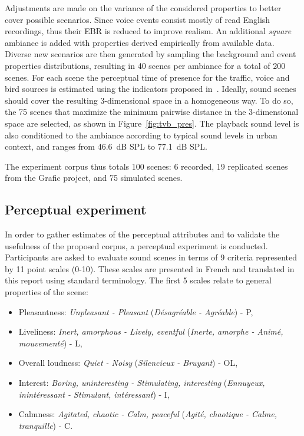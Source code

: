 \documentclass[twocolumn]{article}
\begin{document}
Adjustments are made on the variance of the considered properties to better cover possible scenarios. Since voice events consist mostly of read English recordings, thus their EBR is reduced to improve realism. An additional \textit{square} ambiance is added with properties derived empirically from available data. Diverse new scenarios are then generated by sampling the background and event properties distributions, resulting in 40 scenes per ambiance for a total of 200 scenes. For each scene the perceptual time of presence for the traffic, voice and bird sources is estimated using the indicators proposed in~\cite{gontier2018}. Ideally, sound scenes should cover the resulting 3-dimensional space in a homogeneous way. To do so, the 75 scenes that maximize the minimum pairwise distance in the 3-dimensional space are selected, as shown in Figure~\ref{fig:tvb_pres}. The playback sound level is also conditioned to the ambiance according to typical sound levels in urban context, and ranges from 46.6~dB SPL to 77.1~dB SPL.


The experiment corpus thus totals 100 scenes: 6 recorded, 19 replicated scenes from the Grafic project, and 75 simulated scenes.


\subsection{Perceptual experiment}
\label{sec:data_exp}

In order to gather estimates of the perceptual attributes and to validate the usefulness of the proposed corpus, a perceptual experiment is conducted. Participants are asked to evaluate sound scenes in terms of 9 criteria represented by 11 point scales (0-10). These scales are presented in French and translated in this report using standard terminology. The first 5 scales relate to general properties of the scene:
\begin{itemize}
\item Pleasantness: \textit{Unpleasant - Pleasant} (\textit{D\'esagr\'eable - Agr\'eable}) - P,
\item Liveliness: \textit{Inert, amorphous - Lively, eventful} (\textit{Inerte, amorphe - Anim\'e, mouvement\'e}) - L,
\item Overall loudness: \textit{Quiet - Noisy} (\textit{Silencieux - Bruyant}) - OL,
\item Interest: \textit{Boring, uninteresting - Stimulating, interesting} (\textit{Ennuyeux, inint\'eressant - Stimulant, int\'eressant}) - I,
\item Calmness: \textit{Agitated, chaotic - Calm, peaceful} (\textit{Agit\'e, chaotique - Calme, tranquille}) - C.
\end{itemize}
\end{document}
